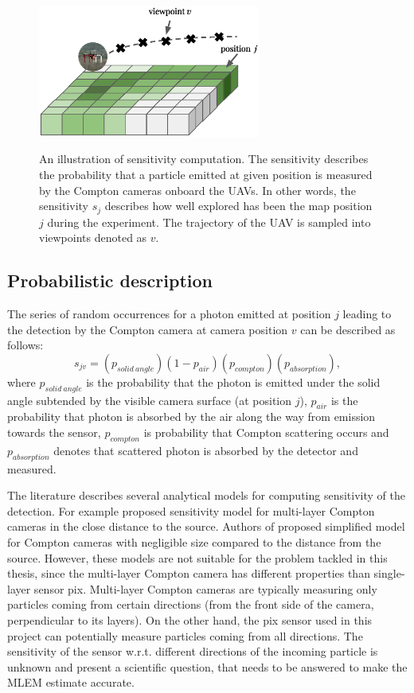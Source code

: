 \begin{figure}[!h]
  \centering
    \includegraphics[width=0.65\textwidth]{./fig/photos/sen.eps}
    \label{fig:sen_illustration}
  \caption{An illustration of sensitivity computation. The sensitivity describes the probability that a particle emitted at given position is measured by the Compton cameras onboard the \ac{UAV}s. In other words, the sensitivity $s_{j}$ describes how well explored has been the map position $j$ during the experiment. The trajectory of the \ac{UAV} is sampled into viewpoints denoted as $v$.}
\end{figure}%

\subsection{Probabilistic description}%
The series of random occurrences for a photon emitted at position $j$ leading to the detection by the Compton camera at camera position $v$ can be described as follows:
\begin{equation}
  s_{jv} =  (p_{solid\ angle})(1-p_{air})(p_{compton})(p_{absorption}),
  \label{eq:sen_prob}
\end{equation}
where $p_{solid\ angle}$ is the probability that the photon is emitted under the solid angle subtended by the visible camera surface (at position $j$), 
$p_{air}$ is the probability that photon is absorbed by the air along the way from emission towards the sensor, 
$p_{compton}$ is probability that Compton scattering occurs and $p_{absorption}$ denotes that scattered photon is absorbed by the detector and measured.

The literature describes several analytical models for computing sensitivity of the detection. 
For example \cite{wilderman2001} proposed sensitivity model for multi-layer Compton cameras in the close distance to the source.
Authors of \cite{maxim2016} proposed simplified model for Compton cameras with negligible size compared to the distance from the source.
However, these models are not suitable for the problem tackled in this thesis, since the multi-layer Compton camera has different properties than single-layer sensor \ac{pix}.
Multi-layer Compton cameras are typically measuring only particles coming from certain directions (from the front side of the camera, perpendicular to its layers).
On the other hand, the \ac{pix} sensor used in this project can potentially measure particles coming from all directions.
The sensitivity of the sensor w.r.t. different directions of the incoming particle is unknown and present a scientific question, that needs to be answered to make the \ac{MLEM} estimate accurate. 

